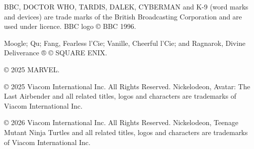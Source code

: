 BBC, DOCTOR WHO, TARDIS, DALEK, CYBERMAN and K-9 (word marks and devices) are trade marks of the British Broadcasting Corporation and are used under licence. BBC logo © BBC 1996.

Moogle; Qu; Fang, Fearless l’Cie; Vanille, Cheerful l’Cie; and Ragnarok, Divine Deliverance ® © SQUARE ENIX.

© 2025 MARVEL.

© 2025 Viacom International Inc. All Rights Reserved. Nickelodeon, Avatar: The Last Airbender and all related titles, logos and characters are trademarks of Viacom International Inc.

© 2026 Viacom International Inc. All Rights Reserved. Nickelodeon, Teenage Mutant Ninja Turtles and all related titles, logos and characters are trademarks of Viacom International Inc.

